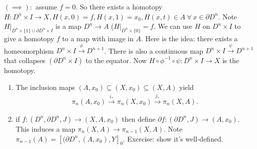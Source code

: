 \documentclass[12pt,class=article,crop=false]{standalone}
\begin{document}
	$ (\implies):$ assume $ f=0$. So there exists a homotopy  $ H:D^{n} \times I \to X, H(x,0) = f, H(x,1)=x_0, H(x,t) \in A \ \forall \ x \in \partial D^{n}$. Note $ H|_{D^{n} \times \{1\} \cup \partial D^{n} \times I}$ is a map $ D^{n} \to A$ ($ H|_{D^{n} \times \{0\} } = f$. We can use $ H$ on  $ D^{n} \times I$ to give a homotopy $ f$ to a map with image in  $ A$. Here is the idea: there exists a homeomorphism  $ D^{n} \times I \xrightarrow{ \phi}  D^{n+1}$. There is also a continuous map $ D^{n} \times I \xrightarrow{ \psi} D^{n+1} $ that collapses $ ( \partial D^{n} \times I)$ to the equator. Now $ H \circ \phi ^{-1} \circ \psi: D^{n} \times I \to X$ is the homotopy.

\begin{note}
\begin{enumerate}[label=(\arabic*)]
	\item The inclusion maps $ (A,x_0) \subseteq (X,x_0) \subseteq (X,A)$ yield
		\begin{align*}
			\pi_n(A,x_0) \xrightarrow{ i_*} \pi_n(X,x_0) \xrightarrow{ j_*} \pi_n(X,A).  
		\end{align*}
	\item if $ f:(D^{n},\partial D^{n},J ) \to (X,A,x_0)$ then define $ \partial f: (\partial D^{n},J) \to (A,x_0)$. This induces a map $ \pi_n(X,A) \to \pi_{n-1}(X,A)$. Note $ \pi_{n-1}(A) = [(\partial D^{n},(A,x_0), Y]_0$. Exercise: show it's well-defined.
\end{enumerate}
\end{note}
\end{document}
